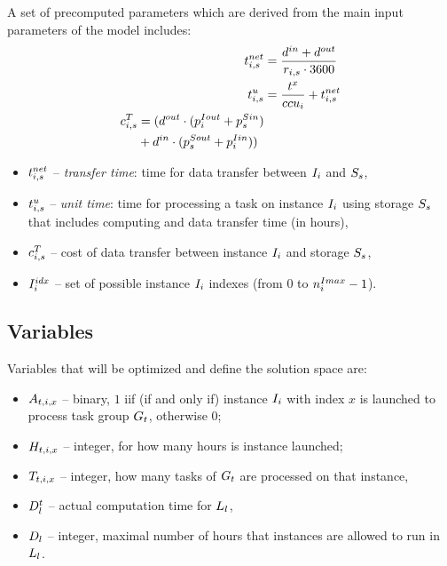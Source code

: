 {    A set of precomputed parameters which are derived from the main input parameters of the model includes:
     \begin{align}
         \transferTime_{i,s} &= \frac{\dataSizeIn+\dataSizeOut}{\transferRate_{i,s} \cdot 3600}  \\
         \label{workflow:unitTime}\unitTime_{i,s} &= \frac{\execTime}{\ccu_i} + \transferTime_{i,s}  \\
         \begin{split}
             \transferCost_{i,s} &= (\dataSizeOut \cdot
             (\instanceTransferPriceOut_i + \storageTransferPriceIn_s) \\ & +
             \dataSizeIn \cdot (\storageTransferPriceOut_s+\instanceTransferPriceIn_i)) \end{split} \\
     \end{align}
    \begin{itemize}
        \item $t^{net}_{i,s}$ -- {\em transfer time}: time for data transfer between
        $I_i$ and $S_s$,
        \item $t^u_{i,s}$ -- {\em unit time}: time for processing a task
        on instance $I_i$ using storage $S_s$ that includes computing and
        data transfer time (in hours),
        \item $c^T_{i,s}$ -- cost of data transfer between instance
        $I_i$ and storage $S_s$,
        \item $I^{idx}_i$ -- set of possible instance $I_i$ indexes (from $0$ to $n^{Imax}_i - 1$).
    \end{itemize}
   
    \subsection{Variables}
    \label{sec:workflow:problem:variables}
    Variables that will be optimized and define the solution space are:
    \begin{itemize}
        \item $A_{t,i,x}$ -- binary, $1$ iif (if and only if) instance $I_i$ with index $x$ is launched to process task group $G_t$, otherwise $0$;
        \item $H_{t,i,x}$ -- integer, for how many hours is instance launched;
        \item $T_{t,i,x}$ -- integer, how many tasks of $G_t$ are processed on that instance,
        \item $D^t_l$ -- actual computation time for $L_l$,
        \item $D_l$ -- integer, maximal number of hours that instances are allowed to run in $L_l$.
    \end{itemize}
    
}
